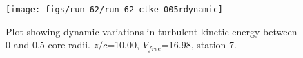 \begin{figure}[H]
\centering
\texttt{[image: figs/run\_62/run\_62\_ctke\_005rdynamic]}
\caption{Plot showing dynamic variations in turbulent kinetic energy between 0 and 0.5 core radii. $z/c$=10.00, $V_{free}$=16.98, station 7.}
\label{fig:run_62_ctke_005rdynamic}
\end{figure}


